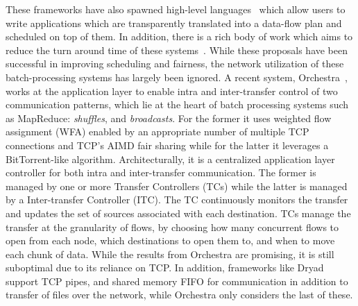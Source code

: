 \documentclass[a4paper,12pt,twoside,openright]{report}
\begin{document}
These frameworks have also spawned high-level
languages~\cite{Olston:2008:PLN,Pike:2005:IDP,Murray:2010:SCS,Yu:2008:DSG} which
allow users to write applications which are transparently translated into a
data-flow plan and scheduled on top of them. In addition, there is a rich body
of work which aims to reduce the turn around time of these
systems~\cite{Zaharia:2010:DSS,Isard:2009:QFS,Zaharia:2008:IMP}. While these
proposals have been successful in improving scheduling and fairness, the network
utilization of these batch-processing systems has largely been ignored. A recent
system, Orchestra~\cite{Chowdhury:2011:MDT}, works at the application layer to
enable intra and inter-transfer control of two communication patterns, which lie
at the heart of batch processing systems such as MapReduce:
\emph{shuffles}, and \emph{broadcasts}. For the former it uses weighted flow
assignment (WFA) enabled by an appropriate number of multiple TCP connections
and TCP's AIMD fair sharing while for the latter it leverages a BitTorrent-like
algorithm. Architecturally, it is a centralized application layer controller for
both intra and inter-transfer communication. The former is managed by one or
more Transfer Controllers (TCs) while the latter is managed by a Inter-transfer
Controller (ITC). The TC continuously monitors the transfer and updates the set
of sources associated with each destination. TCs manage the transfer at the
granularity of flows, by choosing how many concurrent flows to open from each
node, which destinations to open them to, and when to move each chunk of data.
While the results from Orchestra are promising, it is still suboptimal due to
its reliance on TCP. In addition, frameworks like Dryad support TCP pipes, and
shared memory FIFO for communication in addition to transfer of files over the
network, while Orchestra only considers the last of these.
\end{document}

